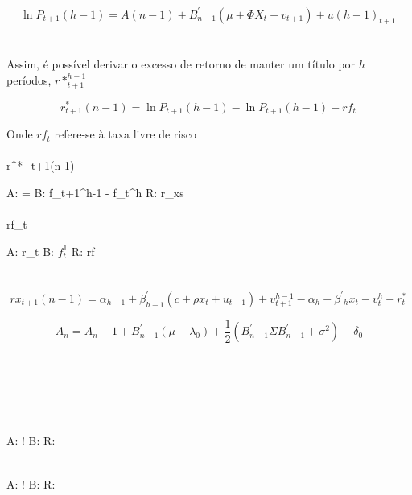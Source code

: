 \documentclass[12pt]{article}
\begin{document}
\begin{equation} %
\ln P_{t+1}(h-1)  =  A(n-1) + B^{\prime}_{n-1} (\mu + \Phi X_t + v_{t+1}) + u(h-1)_{t+1} \,
\end{equation}
\\

\\
Assim, é possível derivar o excesso de retorno de manter um título por $h$ períodos, $r*^{h-1}_{t+1}$ 

\begin{equation} %
r^{*}_{t+1}(n-1)  =  \ln P_{t+1}(h-1) - \ln P_{t+1}(h-1) - rf_t \,
\end{equation}

Onde $rf_t$ refere-se à taxa livre de risco 
\\



\\
r^{*}_{t+1}(n-1)

A: =
B: f_{t+1}^{h-1} - f_t^h
R: r_xs 
\\

\\
rf_t

A: r_t
B: $f^1_t$ 
R: rf
\\

\\
\\
\begin{equation} \label{R(2)}          %
rx_{t+1}(n-1)  = \alpha_{h-1} + \beta^{\prime}_{h-1} (c+\rho x_t + u_{t+1}) + v^{h-1}_{t+1} -\alpha_h - \beta^{\prime}{_h} x_t - v^h_t - r^*_t\,
\end{equation}

\begin{equation} \label{A25_B7}         %
A_n=A_n-1 + B^{\prime}_{n-1}(\mu-\lambda_0) + \frac{1}{2}(B^{\prime}_{n-1} \Sigma B^{\prime}_{n-1} + \sigma^2) - \delta_0
\end{equation}
\\
\\

\\

\\

\\
\alpha


A: !
B: 
R: 
\\

\\
\beta


A: !
B: 
R:
\\
\end{document}
